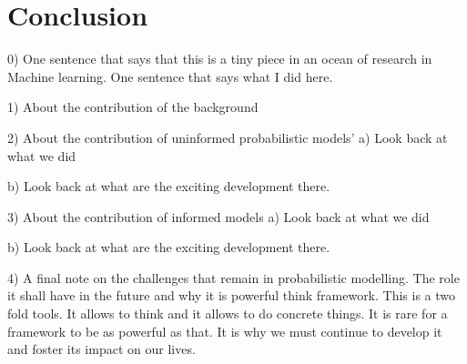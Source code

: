 \chapter{Conclusion}\label{ch:08}
0) One sentence that says that this is a tiny piece in an ocean of research in Machine learning.
One sentence that says what I did here.

1) About the contribution of the background

2) About the contribution of uninformed probabilistic models'
a) Look back at what we did

b) Look back at what are the exciting development there.

3) About the contribution of informed models
a) Look back at what we did

b) Look back at what are the exciting development there.

4) A final note on the challenges that remain in probabilistic modelling.
The role it shall have in the future and why it is powerful think framework.
This is a two fold tools. It allows to think and it allows to do concrete things.
It is rare for a framework to be as powerful as that. It is why we must continue to develop it and foster its impact on our lives.

%
%
%
%
%
%
